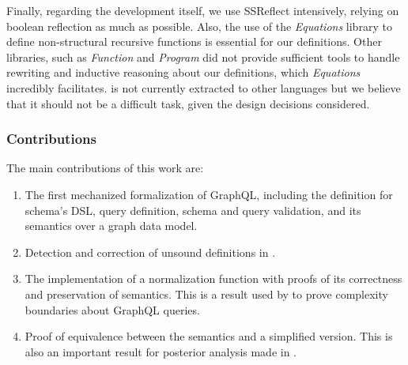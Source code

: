 
Finally, regarding the development itself, we use SSReflect  intensively, relying on boolean reflection as much as possible. Also, the use of the \textit{Equations} library  to define non-structural recursive functions is essential for our definitions. Other libraries, such as \textit{Function} and \textit{Program} did not provide sufficient tools to handle rewriting and inductive reasoning about our definitions, which \textit{Equations} incredibly facilitates. \coql{} is not currently extracted to other languages but we believe that it should not be a difficult task, given the design decisions considered.


\subsubsection*{Contributions}
The main contributions of this work are:
\begin{enumerate}
    \item The first mechanized formalization of GraphQL, including the definition for schema's DSL, query definition, schema and query validation, and its semantics over a graph data model.
    \item Detection and correction of unsound definitions in \HP{}.
    \item The implementation of a normalization function with proofs of its correctness and preservation of semantics. This is a result used by \HP{} to prove complexity boundaries about GraphQL queries.
    \item Proof of equivalence between the semantics and a simplified version. This is also an important result for posterior analysis made in \HP{}.

\end{enumerate}

